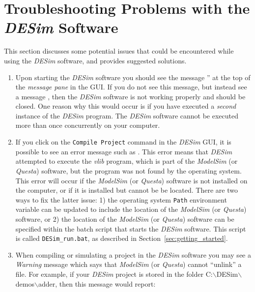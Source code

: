 {\clearpage
\newpage
\section{Troubleshooting Problems with the {\it DESim} Software}
\label{sec:trouble}

This section discusses some potential issues that could be encountered while using the
{\it DESim} software, and provides suggested solutions.

\begin{enumerate}
\item Upon starting the {\it DESim} software you should see the message 
'' at the top of the {\it message pane} in the GUI. If you do 
not see this message, but instead see a message , then 
the {\it DESim} software is not working properly and should be closed. One
reason why this would occur is if you have executed a {\it second}
instance of the {\it DESim} program. The {\it DESim} software cannot be
executed more than once concurrently on your computer. 

\item If you click on the \texttt{Compile Project} command in the {\it DESim} GUI, it is
possible to see an error message such as 
. This error means that
{\it DESim} attempted to execute the {\it vlib} program, which is part of the 
{\it ModelSim} (or {\it Questa}) software, but the program was not found by the
operating system. This error will occur if the {\it ModelSim} (or {\it Questa}) software 
is not installed on the computer, or if it is installed but cannot be be located. There are 
two ways to fix the latter issue: 1) the operating system \texttt{Path} environment variable 
can be updated to include the location of the {\it ModelSim} (or {\it Questa}) software, 
or 2) the location of the {\it ModelSim} (or {\it Questa}) software can be specified within 
the batch script that starts the {\it DESim} software. This script is called 
\texttt{DESim\_run.bat}, as described in Section~\ref{sec:getting_started}.

\item When compiling or simulating a project in the {\it DESim} software you may
see a {\it Warning} message which says that {\it ModelSim} (or {\it Questa}) cannot 
``unlink'' a file.  For example, if your {\it DESim} project is stored in the folder
C:$\backslash$DESim$\backslash$demos$\backslash$adder, then this message would report: 


\end{enumerate}}
